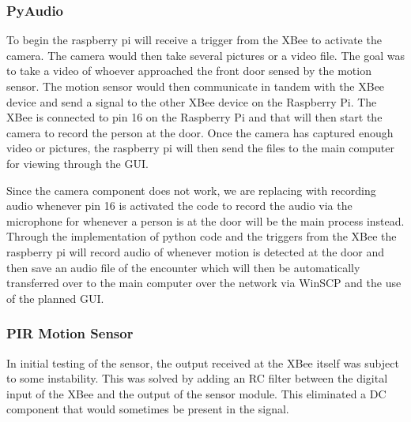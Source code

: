 		\subsubsection{PyAudio}
		\par To begin the raspberry pi will receive a trigger from the XBee to activate the camera. The camera would then take several pictures or a video file. The goal was to take a video of whoever approached the front door sensed by the motion sensor. The motion sensor would then communicate in tandem with the XBee device and send a signal to the other XBee device on the Raspberry Pi. The XBee is connected to pin 16 on the Raspberry Pi and that will then start the camera to record the person at the door. Once the camera has captured enough video or pictures, the raspberry pi will then send the files to the main computer for viewing through the GUI. 
		\par Since the camera component does not work, we are replacing with recording audio whenever pin 16 is activated the code to record the audio via the microphone for whenever a person is at the door will be the main process instead. Through the implementation of python code and the triggers from the XBee the raspberry pi will record audio of whenever motion is detected at the door and then save an audio file of the encounter which will then be automatically transferred over to the main computer over the network via WinSCP and the use of the planned GUI.
		
		\subsubsection{PIR Motion Sensor}
		\par In initial testing of the sensor, the output received at the XBee itself was subject to some instability. This was solved by adding an RC filter between the digital input of the XBee and the output of the sensor module. This eliminated a DC component that would sometimes be present in the signal. 
		
